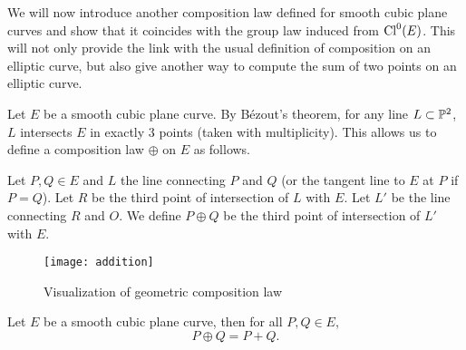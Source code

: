
We will now introduce another composition law defined for smooth cubic plane
curves and show that it coincides with the group law induced from $\operatorname{Cl}^0(E)$.
This will not only provide the link with the usual definition of composition
on an elliptic curve, but also give another way to compute the sum
of two points on an elliptic curve.

Let $E$ be a smooth cubic plane curve.
By Bézout's theorem, for any line $L \subset \mathbb{P}^2$, $L$ intersects
$E$ in exactly 3 points (taken with multiplicity).
This allows us to define a composition law $\oplus$ on $E$ as
follows.

\begin{definition}
	\label{def:group-law}
	Let $P, Q \in E$ and $L$ the line connecting $P$ and $Q$ (or the tangent line
	to $E$ at $P$ if $P = Q$). Let $R$ be the third point of intersection of $L$
	with $E$. Let $L'$ be the line connecting $R$ and $O$. We define $P \oplus Q$
	be the third point of intersection of $L'$ with $E$.
\end{definition}

\begin{figure}[ht]
	\centering
	\texttt{[image: addition]}
	\caption{Visualization of geometric composition law}
\end{figure}


\begin{proposition}
	\label{prop:equivalence-composition}
	Let $E$ be a smooth cubic plane curve, then for all $P, Q \in E$,
	\begin{equation*}
		P \oplus Q = P + Q.
	\end{equation*}
\end{proposition}

